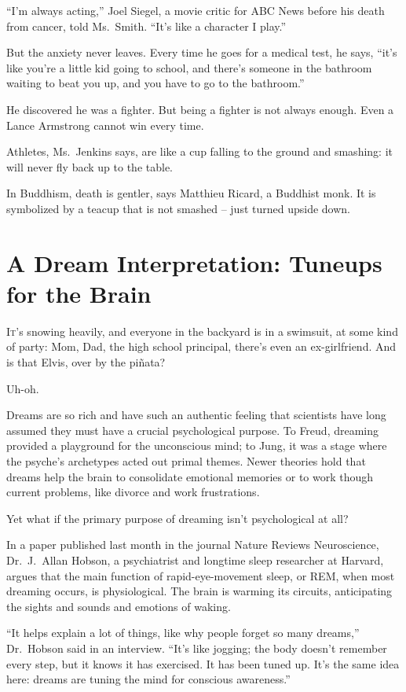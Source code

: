 ﻿\documentclass[12pt]{article}
\begin{document}
``I'm always acting,'' Joel Siegel, a movie critic for ABC News before his death from cancer, told
Ms.~Smith. ``It's like a character I play.''

But the anxiety never leaves. Every time he goes for a medical test, he says, ``it's like you're a
little kid going to school, and there's someone in the bathroom waiting to beat you up, and you have
to go to the bathroom.''

He discovered he was a fighter. But being a fighter is not always enough. Even a Lance Armstrong
cannot win every time.

Athletes, Ms.~Jenkins says, are like a cup falling to the ground and smashing: it will never fly
back up to the table.

In Buddhism, death is gentler, says Matthieu Ricard, a Buddhist monk. It is symbolized by a teacup
that is not smashed -- just turned upside down.

\section{A Dream Interpretation: Tuneups for the Brain}

\lettrine{I}{t}'s snowing heavily, and everyone in the backyard is in a
swimsuit, at some kind of party: Mom, Dad, the high school principal, there's even an ex-girlfriend.
And is that Elvis, over by the pi\~{n}ata?

Uh-oh.

Dreams are so rich and have such an authentic feeling that scientists have long assumed they must
have a crucial psychological purpose. To Freud, dreaming provided a playground for the unconscious
mind; to Jung, it was a stage where the psyche's archetypes acted out primal themes. Newer theories
hold that dreams help the brain to consolidate emotional memories or to work though current
problems, like divorce and work frustrations.

Yet what if the primary purpose of dreaming isn't psychological at all?

In a paper published last month in the journal Nature Reviews Neuroscience, Dr.~J.~Allan Hobson, a
psychiatrist and longtime sleep researcher at Harvard, argues that the main function of
rapid-eye-movement sleep, or REM, when most dreaming occurs, is physiological. The brain is warming
its circuits, anticipating the sights and sounds and emotions of waking.

``It helps explain a lot of things, like why people forget so many dreams,'' Dr.~Hobson said in an
interview. ``It's like jogging; the body doesn't remember every step, but it knows it has exercised.
It has been tuned up. It's the same idea here: dreams are tuning the mind for conscious awareness.''
\end{document}
